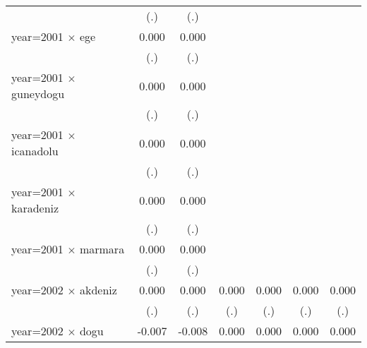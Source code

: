 {\begin{tabular}{l*{6}{c}}
                    &         (.)         &         (.)         &                     &                     &                     &                     \\
year=2001 $\times$ ege&       0.000         &       0.000         &                     &                     &                     &                     \\
                    &         (.)         &         (.)         &                     &                     &                     &                     \\
year=2001 $\times$ guneydogu&       0.000         &       0.000         &                     &                     &                     &                     \\
                    &         (.)         &         (.)         &                     &                     &                     &                     \\
year=2001 $\times$ icanadolu&       0.000         &       0.000         &                     &                     &                     &                     \\
                    &         (.)         &         (.)         &                     &                     &                     &                     \\
year=2001 $\times$ karadeniz&       0.000         &       0.000         &                     &                     &                     &                     \\
                    &         (.)         &         (.)         &                     &                     &                     &                     \\
year=2001 $\times$ marmara&       0.000         &       0.000         &                     &                     &                     &                     \\
                    &         (.)         &         (.)         &                     &                     &                     &                     \\
year=2002 $\times$ akdeniz&       0.000         &       0.000         &       0.000         &       0.000         &       0.000         &       0.000         \\
                    &         (.)         &         (.)         &         (.)         &         (.)         &         (.)         &         (.)         \\
year=2002 $\times$ dogu&      -0.007         &      -0.008         &       0.000         &       0.000         &       0.000         &       0.000         \\

\end{tabular}}
